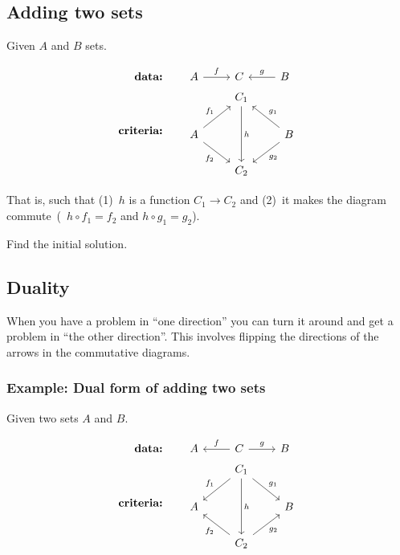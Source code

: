 \subsection{Adding two sets}

Given $A$ and $B$ sets.

\begin{align*}
    \textbf{data:} \qquad& \begin{tikzcd}[ampersand replacement=\&]
            A \arrow[r, "f"] \& C \& B \arrow[l, swap, "g"]
        \end{tikzcd}\\
    \textbf{criteria:} \qquad& \begin{tikzcd}[ampersand replacement=\&]
        {} \& C_1 \arrow[dd, "h"] \& {} \\
        A \arrow[ru, "f_1"] \arrow[rd, swap, "f_2"]
        \& {}
        \&
        B \arrow[lu, swap, "g_1"] \arrow[ld, "g_2"]
        \\
        {} \& C_2 \& {}
    \end{tikzcd}
\end{align*}

That is, such that (1)~$h$ is a function $C_1 \rightarrow C_2$ and (2)~it
makes the diagram commute~(\ie~$h \circ f_1 = f_2$ and $h \circ g_1 = g_2$).

\begin{exercise}
    Find the initial solution. \label{ex:addsets}
\end{exercise}

\subsection{Duality}

When you have a problem in ``one direction'' you can turn it around and get a
problem in ``the other direction''. This involves flipping the directions of
the arrows in the commutative diagrams.

\subsubsection*{Example: Dual form of adding two sets}

Given two sets $A$ and $B$.

\begin{align*}
     \textbf{data:}\qquad & \begin{tikzcd}[ampersand replacement=\&]
            A \& C \arrow[l, swap, "f"] \arrow[r, "g"] \& B
        \end{tikzcd} \\
    \textbf{criteria:}\qquad & \begin{tikzcd}[ampersand replacement=\&]
          {} \& C_1 \arrow[dd, "h"] \arrow[ld, swap, "f_1"] \arrow[rd, "g_1"]
          \& {} \\ A \& {} \& B \\
          {} \& C_2 \arrow[lu, "f_2"] \arrow[ru, swap, "g_2"] \& {}
      \end{tikzcd}
\end{align*}



